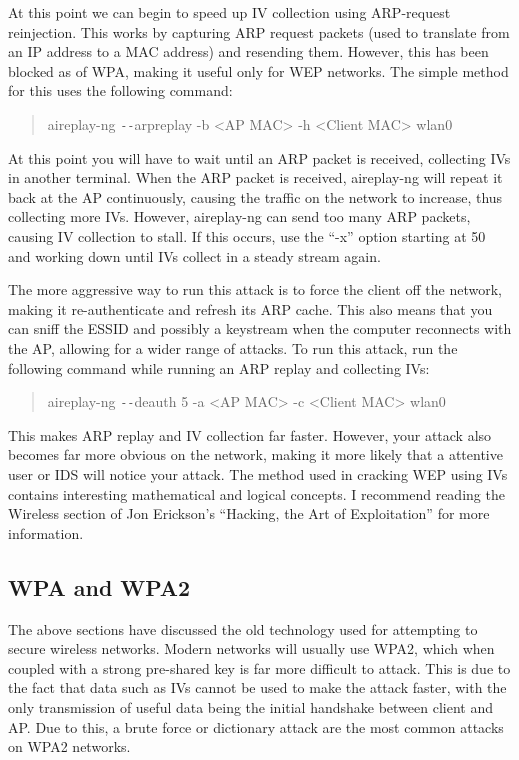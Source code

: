 \documentclass[a4paper,11pt]{report}
\begin{document}
			At this point we can begin to speed up IV collection using ARP-request reinjection. 
			This works by capturing ARP request packets (used to translate from an IP address to a MAC address) and resending them. 
			However, this has been blocked as of WPA, making it useful only for WEP networks.
			The simple method for this uses the following command:
			\begin{quote}
				aireplay-ng \verb+--+arpreplay -b <AP MAC> -h <Client MAC> wlan0
			\end{quote}
			At this point you will have to wait until an ARP packet is received, collecting IVs in another terminal. 
			When the ARP packet is received, aireplay-ng will repeat it back at the AP continuously, causing the traffic on the network to increase, thus collecting more IVs. 
			However, aireplay-ng can send too many ARP packets, causing IV collection to stall. 
			If this occurs, use the ``-x'' option starting at 50 and working down until IVs collect in a steady stream again. 

			The more aggressive way to run this attack is to force the client off the network, making it re-authenticate and refresh its ARP cache. 
			This also means that you can sniff the ESSID and possibly a keystream when the computer reconnects with the AP, allowing for a wider range of attacks. 
			To run this attack, run the following command while running an ARP replay and collecting IVs:
			\begin{quote}
				aireplay-ng \verb+--+deauth 5 -a <AP MAC> -c <Client MAC> wlan0
			\end{quote}
			This makes ARP replay and IV collection far faster.
			However, your attack also becomes far more obvious on the network, making it more likely that a attentive user or IDS will notice your attack. 
			The method used in cracking WEP using IVs contains interesting mathematical and logical concepts. 
			I recommend reading the Wireless section of Jon Erickson's ``Hacking, the Art of Exploitation''\cite{HackingAOE} for more information.
			
		\subsection{WPA and WPA2}
			The above sections have discussed the old technology used for attempting to secure wireless networks. 
			Modern networks will usually use WPA2, which when coupled with a strong pre-shared key is far more difficult to attack. 
			This is due to the fact that data such as IVs cannot be used to make the attack faster, with the only transmission of useful data being the initial handshake between client and AP. 
			Due to this, a brute force or dictionary attack are the most common attacks on WPA2 networks. 
\end{document}
